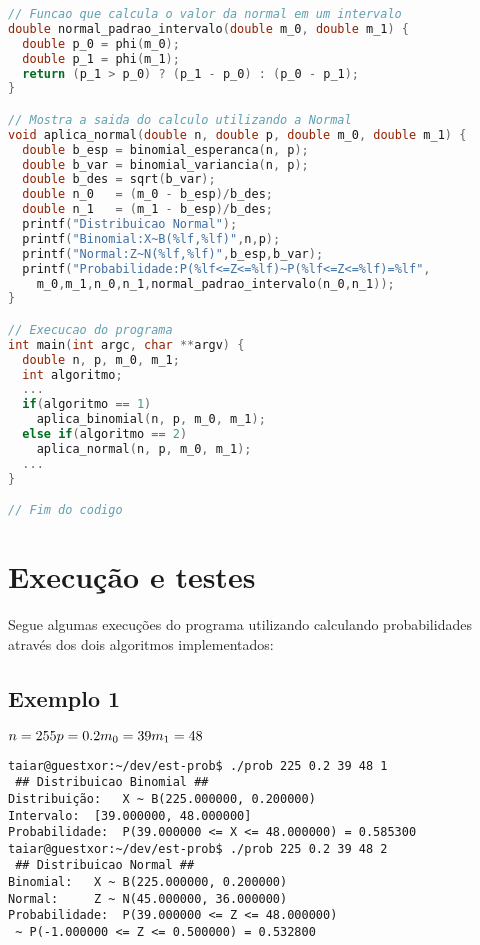 \documentclass[12pt, a4paper]{article}
\begin{document}
\begin{lstlisting}[language=c]
// Funcao que calcula o valor da normal em um intervalo
double normal_padrao_intervalo(double m_0, double m_1) {
  double p_0 = phi(m_0);
  double p_1 = phi(m_1);
  return (p_1 > p_0) ? (p_1 - p_0) : (p_0 - p_1);
}

// Mostra a saida do calculo utilizando a Normal
void aplica_normal(double n, double p, double m_0, double m_1) {
  double b_esp = binomial_esperanca(n, p);
  double b_var = binomial_variancia(n, p);
  double b_des = sqrt(b_var);
  double n_0   = (m_0 - b_esp)/b_des;
  double n_1   = (m_1 - b_esp)/b_des;
  printf("Distribuicao Normal");
  printf("Binomial:X~B(%lf,%lf)",n,p);
  printf("Normal:Z~N(%lf,%lf)",b_esp,b_var);
  printf("Probabilidade:P(%lf<=Z<=%lf)~P(%lf<=Z<=%lf)=%lf",
    m_0,m_1,n_0,n_1,normal_padrao_intervalo(n_0,n_1));
}

// Execucao do programa
int main(int argc, char **argv) {
  double n, p, m_0, m_1;
  int algoritmo;
  ...
  if(algoritmo == 1)
    aplica_binomial(n, p, m_0, m_1);
  else if(algoritmo == 2)
    aplica_normal(n, p, m_0, m_1);
  ...
}

// Fim do codigo

\end{lstlisting}

\newpage

\section{Execução e testes}

Segue algumas execuções do programa utilizando calculando probabilidades através dos dois algoritmos
implementados:

\subsection{Exemplo 1}

$
n = 255     \\
p = 0.2     \\
m_0 = 39    \\
m_1 = 48
$

\begin{verbatim}
taiar@guestxor:~/dev/est-prob$ ./prob 225 0.2 39 48 1
 ## Distribuicao Binomial ##
Distribuição:   X ~ B(225.000000, 0.200000)
Intervalo:  [39.000000, 48.000000]
Probabilidade:  P(39.000000 <= X <= 48.000000) = 0.585300
taiar@guestxor:~/dev/est-prob$ ./prob 225 0.2 39 48 2
 ## Distribuicao Normal ##
Binomial:   X ~ B(225.000000, 0.200000)
Normal:     Z ~ N(45.000000, 36.000000)
Probabilidade:  P(39.000000 <= Z <= 48.000000)
 ~ P(-1.000000 <= Z <= 0.500000) = 0.532800
\end{verbatim}
\end{document}
